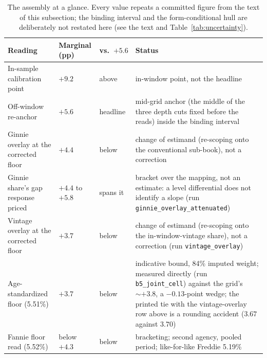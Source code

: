 \begin{table}[!t]
\centering
\caption{The assembly at a glance. Every value repeats a committed figure from the text of this subsection; the binding interval and the form-conditional hull are deliberately not restated here (see the text and Table~\ref{tab:uncertainty}).}
\label{tab:assembly}
\footnotesize
\begin{tabular}{@{}p{3.1cm}p{2.6cm}p{2.4cm}p{7.7cm}@{}}
\toprule
Reading & Marginal (pp) & vs.\ $+5.6$ & Status \\
\midrule
In-sample calibration point & $+9.2$ & above & in-window point, not the headline \\
Off-window re-anchor & $+5.6$ & headline & mid-grid anchor (the middle of the three depth cuts fixed before the reads) inside the binding interval \\
Ginnie overlay at the corrected floor & $+4.4$ & below & change of estimand (re-scoping onto the conventional sub-book), not a correction \\
Ginnie share's gap response priced & $+4.4$ to $+5.8$ & spans it & bracket over the mapping, not an estimate: a level differential does not identify a slope (run \texttt{ginnie\_overlay\_attenuated}) \\ Vintage overlay at the corrected floor & $+3.7$ & below & change of estimand (re-scoping onto the in-window-vintage share), not a correction (run \texttt{vintage\_overlay}) \\
Age-standardized floor (5.51\%) & $+3.7$ & below & indicative bound, 84\% imputed weight; measured directly (run \texttt{b5\_joint\_cell}) against the grid's $\sim +3.8$, a $-0.13$-point wedge; the printed tie with the vintage-overlay row above is a rounding accident ($3.67$ against $3.70$) \\
Fannie floor read (5.52\%) & below $+4.3$ & below & bracketing; second agency, pooled period; like-for-like Freddie 5.19\% \\

\end{tabular}
\end{table}
